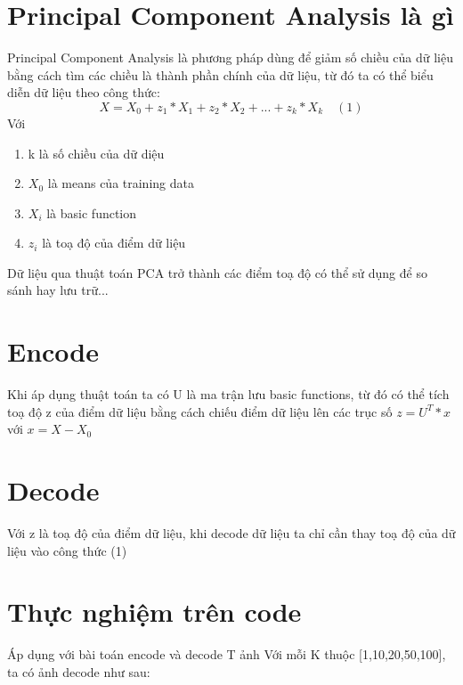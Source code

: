 \documentclass[12pt,letterpaper]{article}
\begin{document}
\section*{Principal Component Analysis là gì}

Principal Component Analysis là phương pháp dùng để giảm số chiều của dữ liệu bằng cách tìm các chiều là thành phần chính của dữ liệu, từ đó ta có thể biểu diễn dữ liệu theo công thức:
$$
    X = X_0 + z_1*X_1 + z_2*X_2 + ... + z_k*X_k    \quad (1)
$$
Với 
\begin{enumerate}
    \item k là số chiều của dữ diệu
    \item $X_0$ là means của training data
    \item $X_i$ là basic function
    \item $z_i$ là toạ độ của điểm dữ liệu
\end{enumerate}
Dữ liệu qua thuật toán PCA trở thành các điểm toạ độ có thể sử dụng để so sánh hay lưu trữ...

\section*{Encode}
Khi áp dụng thuật toán ta có U là ma trận lưu basic functions, từ đó có thể tích toạ độ z của điểm dữ liệu bằng cách chiếu điểm dữ liệu lên các trục số
$z = U^T * x$ với $x = X - X_0$
\section*{Decode}
Với z là toạ độ của điểm dữ liệu, khi decode dữ liệu ta chỉ cần thay toạ độ của dữ liệu vào công thức (1)
\section*{Thực nghiệm trên code}
Áp dụng với bài toán encode và decode T ảnh
Với mỗi K thuộc [1,10,20,50,100], ta có ảnh decode như sau: 
\end{document}
